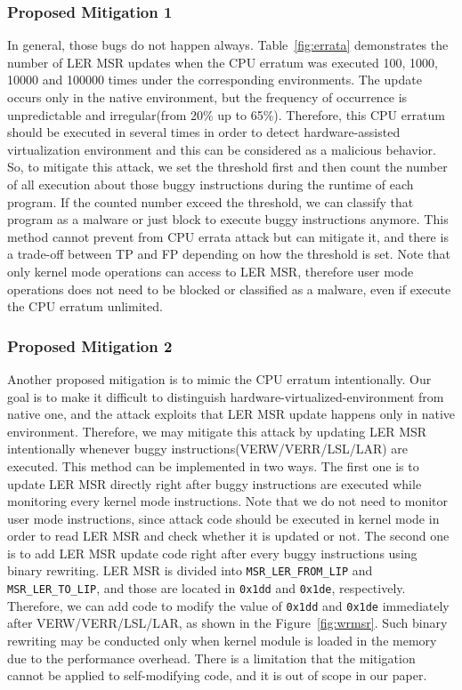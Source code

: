\subsubsection{Proposed Mitigation 1}
In general, those bugs do not happen always. Table~\ref{fig:errata} demonstrates the number of LER MSR updates when the CPU erratum was executed 100, 1000, 10000 and 100000 times under the corresponding environments. The update occurs only in the native environment, but the frequency of occurrence is unpredictable and irregular(from 20\% up to 65\%). Therefore, this CPU erratum should be executed in several times in order to detect hardware-assisted virtualization environment and this can be considered as a malicious behavior. So, to mitigate this attack, we set the threshold first and then count the number of all execution about those buggy instructions during the runtime of each program. If the counted number exceed the threshold, we can classify that program as a malware or just block to execute buggy instructions anymore. This method cannot prevent from CPU errata attack but can mitigate it, and there is a trade-off between TP and FP depending on how the threshold is set. Note that only kernel mode operations can access to LER MSR, therefore user mode operations does not need to be blocked or classified as a malware, even if execute the CPU erratum unlimited.

\subsubsection{Proposed Mitigation 2}
Another proposed mitigation is to mimic the CPU erratum intentionally. Our goal is to make it difficult to distinguish hardware-virtualized-environment from native one, and the attack exploits that LER MSR update happens only in native environment. Therefore, we may mitigate this attack by updating LER MSR intentionally whenever buggy instructions(VERW/VERR/LSL/LAR) are executed. This method can be implemented in two ways. The first one is to update LER MSR directly right after buggy instructions are executed while monitoring every kernel mode instructions. Note that we do not need to monitor user mode instructions, since attack code should be executed in kernel mode in order to read LER MSR and check whether it is updated or not. The second one is to add LER MSR update code right after every buggy instructions using binary rewriting. LER MSR is divided into {\tt MSR\_LER\_FROM\_LIP} and {\tt MSR\_LER\_TO\_LIP}, and those are located in {\tt 0x1dd} and {\tt 0x1de}, respectively. Therefore, we can add code to modify the value of {\tt0x1dd} and {\tt 0x1de} immediately after VERW/VERR/LSL/LAR, as shown in the Figure~\ref{fig:wrmsr}. Such binary rewriting may be conducted only when kernel module is loaded in the memory due to the performance overhead. There is a limitation that the mitigation cannot be applied to self-modifying code, and it is out of scope in our paper.

